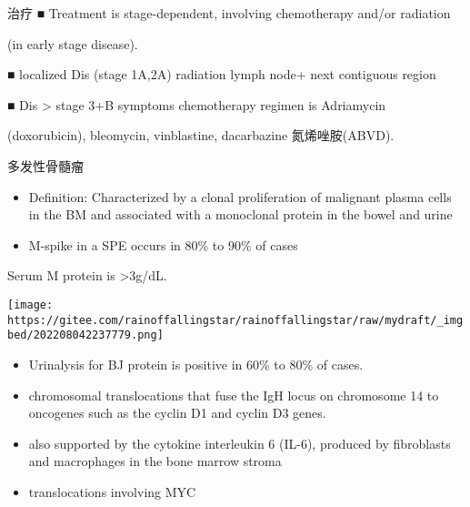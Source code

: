 \documentclass[
  ignorenonframetext,
]{beamer}
\providecommand{\tightlist}{%
  \setlength{\itemsep}{0pt}\setlength{\parskip}{0pt}}
\begin{document}
\begin{frame}
\begin{block}{治疗}
\protect\hypertarget{ux6cbbux7597-11}{}
■ Treatment is stage-dependent, involving chemotherapy and/or radiation

(in early stage disease).

■ localized Dis (stage 1A,2A) radiation lymph node+ next contiguous
region

■ Dis \textgreater{} stage 3+B symptoms chemotherapy regimen is
Adriamycin

(doxorubicin), bleomycin, vinblastine, dacarbazine 氮烯唑胺(ABVD).
\end{block}
\end{frame}

\begin{frame}
\begin{block}{多发性骨髓瘤}
\protect\hypertarget{ux591aux53d1ux6027ux9aa8ux9ad3ux7624}{}
\begin{itemize}
\item
  Definition: Characterized by a clonal proliferation of malignant
  plasma cells in the BM and associated with a monoclonal protein in the
  bowel and urine
\item
  M-spike in a SPE occurs in 80\% to 90\% of cases
\end{itemize}

Serum M protein is \textgreater3g/dL.

\texttt{[image: https://gitee.com/rainoffallingstar/rainoffallingstar/raw/mydraft/\_imgbed/202208042237779.png]}

\begin{itemize}
\tightlist
\item
  Urinalysis for BJ protein is positive in 60\% to 80\% of cases.
\end{itemize}
\end{block}
\end{frame}

\begin{frame}
\begin{itemize}
\item
  chromosomal translocations that fuse the IgH locus on chromosome 14 to
  oncogenes such as the cyclin D1 and cyclin D3 genes.
\item
  also supported by the cytokine interleukin 6 (IL-6), produced by
  fibroblasts and macrophages in the bone marrow stroma
\item
  translocations involving MYC
\end{itemize}
\end{frame}
\end{document}
